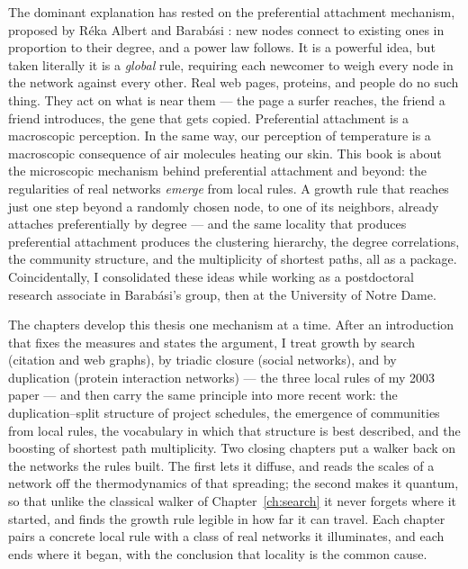 \documentclass[10pt]{book}
\begin{document}
The dominant explanation has rested on the preferential attachment mechanism, 
proposed by R\'eka Albert and Barab\'asi \citeyearpar{barabasi1999}: new nodes connect to existing ones
in proportion to their degree, and a power law follows. It is a powerful 
idea, but taken literally it is a \emph{global} rule, requiring each newcomer 
to weigh every node in the network against every other. Real web pages, 
proteins, and people do no such thing. They act on what is near them --- the 
page a surfer reaches, the friend a friend introduces, the gene that gets 
copied. Preferential attachment is a macroscopic perception. In the same way, our perception of temperature is a macroscopic consequence of air molecules heating our skin. This book is about the microscopic mechanism behind 
preferential attachment and beyond: the regularities of real networks 
\emph{emerge} from local rules. A growth rule that reaches just one step 
beyond a randomly chosen node, to one of its neighbors, already attaches 
preferentially by degree --- and the same locality that produces preferential 
attachment produces the clustering hierarchy, the degree correlations, the 
community structure, and the multiplicity of shortest paths, all as a 
package. Coincidentally, I consolidated these ideas while working as a postdoctoral research associate in Barab\'asi's group, then at the University of Notre Dame.

The chapters develop this thesis one mechanism at a time. After an introduction
that fixes the measures and states the argument, I treat growth by search
(citation and web graphs), by triadic closure (social networks), and by
duplication (protein interaction networks) --- the three local rules of my 2003
paper --- and then carry the same principle into more recent work: the
duplication--split structure of project schedules, the emergence of communities
from local rules, the vocabulary in which that structure is best described, and the
boosting of shortest path multiplicity. Two closing chapters put a walker back on the
networks the rules built. The first lets it diffuse, and reads the scales of a network
off the thermodynamics of that spreading; the second makes it quantum, so that unlike
the classical walker of Chapter~\ref{ch:search} it never forgets where it started,
and finds the growth rule legible in how far it can travel. Each chapter
pairs a concrete local rule with a class of real networks it illuminates, and
each ends where it began, with the conclusion that locality is the common cause.
\end{document}
